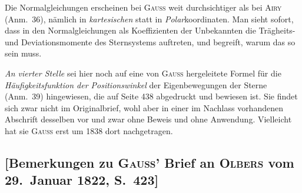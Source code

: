 \documentclass[12pt,a4paper]{article}
\theoremstyle{plain}
\theoremstyle{definition}
\theoremstyle{remark}
\begin{document}
\begin{small}
Die Normalgleichungen erscheinen bei \textsc{Gauss} weit durchsichtiger als bei
\textsc{Airy} (Anm.~36), n\"amlich in \textit{kartesischen} statt in \textit{Polar}koordinaten.
Man sieht sofort, dass in den Normalgleichungen als Koeffizienten der Unbekannten
die Tr\"agheits- und Deviationsmomente des Sternsystems auftreten, und begreift,
warum das so sein muss.

\textit{An vierter Stelle} sei hier noch auf eine von \textsc{Gauss} hergeleitete Formel f\"ur die
\textit{H\"aufigkeitsfunktion der Positionswinkel} der Eigenbewegungen der Sterne (Anm.~39)
hingewiesen, die auf Seite 438 abgedruckt und bewiesen ist. Sie findet sich zwar
nicht im Originalbrief, wohl aber in einer im Nachlass vorhandenen Abschrift
desselben vor und zwar ohne Beweis und ohne Anwendung. Vielleicht hat sie
\textsc{Gauss} erst um 1838 dort nachgetragen.
\end{small}

\newpage
\subsection*{[Bemerkungen zu \textsc{Gauss'} Brief an \textsc{Olbers} vom 29.~Januar 1822, S.~423]}
\end{document}
